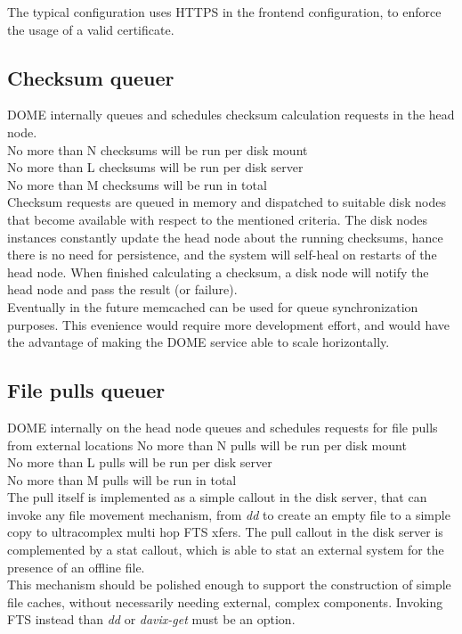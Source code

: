 \documentclass[a4paper,10pt]{scrreprt}
\begin{document}
The typical configuration uses HTTPS in the frontend configuration, to enforce the usage of a valid certificate.\\

\subsection{Checksum queuer}
 DOME internally queues and schedules checksum calculation requests in the head node.\\
 No more than N checksums will be run per disk mount\\
 No more than L checksums will be run per disk server\\
 No more than M checksums will be run in total\\

 Checksum requests are queued in memory and dispatched to suitable disk nodes that become available with respect to the mentioned criteria. The disk nodes instances constantly update the head node about the running checksums, hance there is no need for persistence,
 and the system will self-heal on restarts of the head node. When finished calculating a checksum, a disk node will notify the head node and pass the result (or failure).\\
 Eventually in the future memcached can be used for queue synchronization purposes. This evenience would require more development effort, and would have the
 advantage of making the DOME service able to scale horizontally.\\

\subsection{File pulls queuer}
DOME internally on the head node queues and schedules requests for file pulls from external locations
 No more than N pulls will be run per disk mount\\
 No more than L pulls will be run per disk server\\
 No more than M pulls will be run in total\\

The pull itself is implemented as a simple callout in the disk server, that can invoke any file movement mechanism, from
\textit{dd} to create an empty file to a simple copy to ultracomplex multi hop FTS xfers.
The pull callout in the disk server is complemented by a stat callout, which is able to stat an external system for the presence of an offline file.\\
This mechanism should be polished enough to support the construction of simple file caches,
without necessarily needing external, complex components. Invoking FTS instead than \textit{dd} or \textit{davix-get} must be an option.\\
\end{document}

